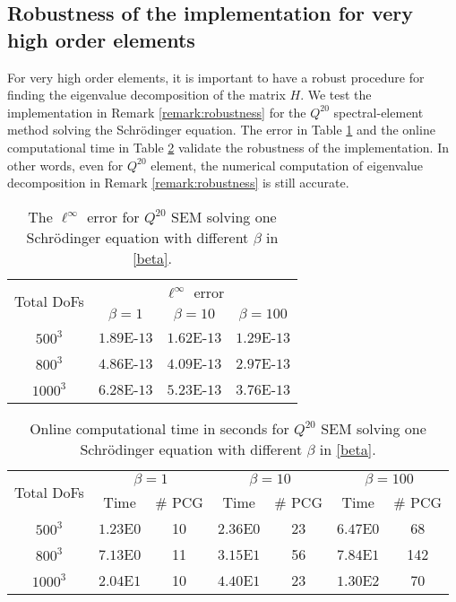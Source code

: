 \documentclass{article}
\begin{document}
\subsection{Robustness of the implementation for very high order elements}
\label{sec:robustness}

For very high order elements, it is important to have a robust procedure for finding the eigenvalue decomposition of the matrix $H$. We test the implementation in Remark \ref{remark:robustness} for the $Q^{20}$
spectral-element method solving the Schr{\"o}dinger equation.
 The error in Table \ref{tab8: Q20} and the online computational time in Table \ref{tab9: Q20} validate the robustness of the implementation. In other words, even for $Q^{20}$ element, the numerical computation of eigenvalue decomposition in Remark \ref{remark:robustness} is still accurate.  
 

\begin{table}[ht!]
    \centering
    \begin{tabular}{|c|c|c|c|}
    \hline
     \multirow{2}{*}{Total DoFs}& \multicolumn{3}{c|}{$\ell^\infty$ error} \\ \cline{2-4}
        &$\beta = 1$ & $\beta = 10$ & $\beta = 100$\\ 
    \hline
         $500^3$ & $1.89$E-$13$ & $1.62$E-$13$ & $1.29$E-$13$ \\
    \hline
         $800^3$ &  $4.86$E-$13$ & $4.09$E-$13$ & $2.97$E-$13$\\
    \hline
         $1000^3$ &  $6.28$E-$13$ & $5.23$E-$13$ & $3.76$E-$13$ \\
    \hline
    \end{tabular}
    \caption{The $\ell^\infty$ error for $Q^{20}$ SEM solving one  Schr{\"o}dinger equation with different $\beta$ in \eqref{beta}. }
    \label{tab8: Q20}
\end{table}

\begin{table}[ht!]
    \centering
    \begin{tabular}{|c|c|c|c|c|c|c|}
    \hline
     \multirow{2}{*}{Total DoFs}& \multicolumn{2}{c|}{$\beta = 1$} & \multicolumn{2}{c|}{$\beta = 10$} & \multicolumn{2}{c|}{$\beta = 100$}\\ \cline{2-7}
         & Time & $\#$ PCG & Time & $\#$ PCG & Time & $\#$ PCG\\
    \hline
         $500^3$ & $1.23$E$0$ & 10 & $2.36$E$0$ & 23 & $6.47$E$0$ & 68\\
    \hline
         $800^3$ &  $7.13$E$0$ & 11 & $3.15$E$1$ &  56 & $7.84$E$1$ & 142\\
    \hline
         $1000^3$ &  $2.04$E$1$ & 10 & $4.40$E$1$ &  23 & $1.30$E$2$ & 70\\
    \hline
    \end{tabular}
    \caption{Online computational time in seconds for $Q^{20}$ SEM solving one  Schr{\"o}dinger equation with different $\beta$ in \eqref{beta}. }
    \label{tab9: Q20}
\end{table}
\end{document}
